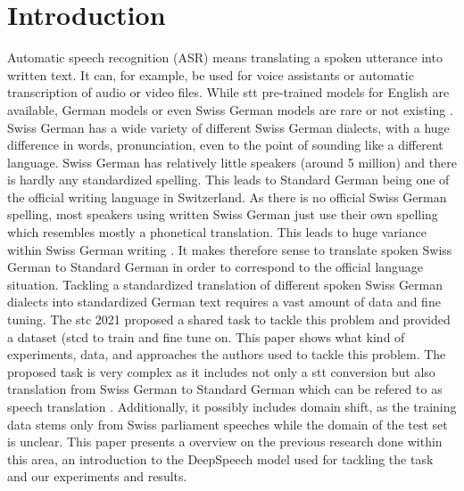 \section{Introduction}
Automatic speech recognition (ASR) means translating a spoken utterance into written text. It can, for example, be used for voice assistants or automatic transcription of audio or video files. While \gls{stt} pre-trained models for English are available, German models or even Swiss German models are rare or not existing \cite{Agarwal2019GermanES}. Swiss German has a wide variety of different Swiss German dialects, with a huge difference in words, pronunciation, even to the point of sounding like a different language. Swiss German has relatively little speakers (around 5 million) and there is hardly any standardized spelling. This leads to Standard German being one of the official writing language in Switzerland. As there is no official Swiss German spelling, most speakers using written Swiss German just use their own spelling which resembles mostly a phonetical translation. This leads to huge variance within Swiss German writing \citep{pluss2020}. It makes therefore sense to translate spoken Swiss German to Standard German in order to correspond to the official language situation. Tackling a standardized translation of different spoken Swiss German dialects into standardized German text requires a vast amount of data and fine tuning. The \gls{stc} 2021 proposed a shared task to tackle this problem and provided a dataset
(\gls{stcd} to train and fine tune on. This paper shows what kind of experiments, data, and approaches the authors used to tackle this problem. The proposed task is very complex as it includes not only a \gls{stt} conversion but also translation from Swiss German to Standard German which can be refered to as speech translation \cite{pluss2020}. Additionally, it possibly includes domain shift, as the training data stems only from Swiss parliament speeches while the domain of the test set is unclear. 
This paper presents a overview on the previous research done within this area, an introduction to the DeepSpeech model used for tackling the task and our experiments and results.  

